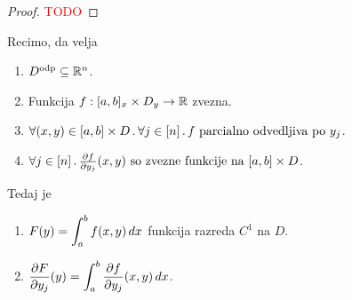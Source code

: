 \begin{proof}
    \textcolor{red}{TODO}
\end{proof}

\newpage
\begin{posledica}
    Recimo, da velja
    \begin{enumerate}
        \item $D^\text{odp} \subseteq \mathbb{R}^n$.
        \item Funkcija $f: [a,b]_x \times D_y \to \mathbb{R}$ zvezna.
        \item $\forall (x,y) \in [a,b] \times D \,.\, \forall j \in [n] \,.\, f \text{ parcialno odvedljiva po } y_j$.
        \item $\forall j \in [n] \,.\, \frac{\partial f}{\partial y_j}(x,y) \text{ so zvezne funkcije na } [a,b] \times D$.
    \end{enumerate}
    Tedaj je 
    \begin{enumerate}
        \item $\displaystyle F(y) = \int_{a}^{b} f(x,y) \, dx $ funkcija razreda $C^1$ na $D$.
        \item $\displaystyle \frac{\partial F}{\partial y_j}(y) = \int_{a}^{b} \frac{\partial f}{\partial y_j}(x,y) \, dx$.
    \end{enumerate}
    
\end{posledica}